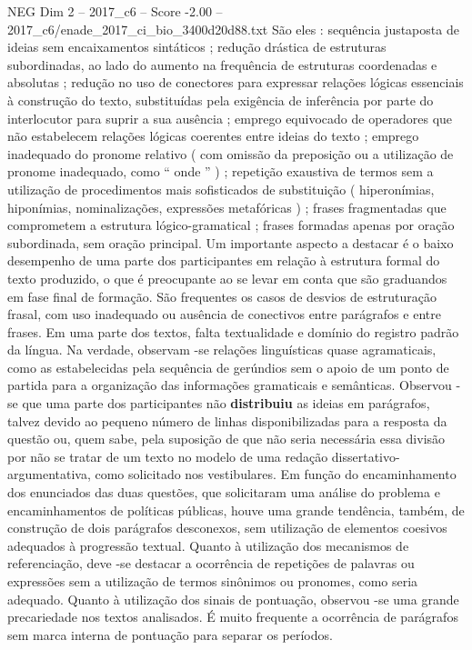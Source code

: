 \begin{textsample}{NEG Dim 2 – 2017\_c6 – Score -2.00 – 2017\_c6/enade\_2017\_ci\_bio\_3400d20d88.txt}
São eles : sequência justaposta de ideias sem encaixamentos sintáticos ; redução drástica de estruturas subordinadas, ao lado do aumento na frequência de estruturas coordenadas e absolutas ; redução no uso de conectores para expressar relações lógicas essenciais à construção do texto, substituídas pela exigência de inferência por parte do interlocutor para suprir a sua ausência ; emprego equivocado de operadores que não estabelecem relações lógicas coerentes entre ideias do texto ; emprego inadequado do pronome relativo ( com omissão da preposição ou a utilização de pronome inadequado, como “ onde ” ) ; repetição exaustiva de termos sem a utilização de procedimentos mais sofisticados de substituição ( hiperonímias, hiponímias, nominalizações, expressões metafóricas ) ; frases fragmentadas que comprometem a estrutura lógico-gramatical ; frases formadas apenas por oração subordinada, sem oração principal.
Um importante aspecto a destacar é o baixo desempenho de uma parte dos participantes em relação à estrutura formal do texto produzido, o que é preocupante ao se levar em conta que são graduandos em fase final de formação.
São frequentes os casos de desvios de estruturação frasal, com uso inadequado ou ausência de conectivos entre parágrafos e entre frases.
Em uma parte dos textos, falta textualidade e domínio do registro padrão da língua.
Na verdade, observam -se relações linguísticas quase agramaticais, como as estabelecidas pela sequência de gerúndios sem o apoio de um ponto de partida para a organização das informações gramaticais e semânticas.
Observou -se que uma parte dos participantes não \textbf{distribuiu} as ideias em parágrafos, talvez devido ao pequeno número de linhas disponibilizadas para a resposta da questão ou, quem sabe, pela suposição de que não seria necessária essa divisão por não se tratar de um texto no modelo de uma redação dissertativo-argumentativa, como solicitado nos vestibulares.
Em função do encaminhamento dos enunciados das duas questões, que solicitaram uma análise do problema e encaminhamentos de políticas públicas, houve uma grande tendência, também, de construção de dois parágrafos desconexos, sem utilização de elementos coesivos adequados à progressão textual.
Quanto à utilização dos mecanismos de referenciação, deve -se destacar a ocorrência de repetições de palavras ou expressões sem a utilização de termos sinônimos ou pronomes, como seria adequado.
Quanto à utilização dos sinais de pontuação, observou -se uma grande precariedade nos textos analisados.
É muito frequente a ocorrência de parágrafos sem marca interna de pontuação para separar os períodos.

\end{textsample}
